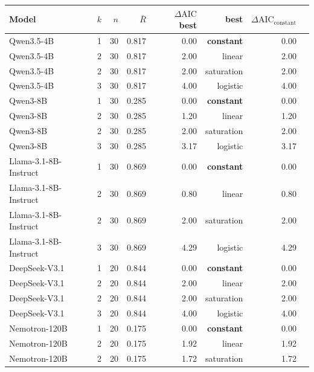 \documentclass{article}
\begin{document}
\begin{table}[t]
  \centering
  \small
  \begin{tabular}{lrrrrrrl}
    \toprule
    Model & $k$ & $n$ & $\bar R$ & $\Delta\text{AIC}$ best & best & $\Delta \text{AIC}_\text{constant}$ \\
    \midrule
    Qwen3.5-4B            & 1 & 30 & 0.817 & 0.00 & \textbf{constant}    & 0.00 \\
    Qwen3.5-4B            & 2 & 30 & 0.817 & 2.00 & linear              & 2.00 \\
    Qwen3.5-4B            & 2 & 30 & 0.817 & 2.00 & saturation          & 2.00 \\
    Qwen3.5-4B            & 3 & 30 & 0.817 & 4.00 & logistic            & 4.00 \\
    Qwen3-8B              & 1 & 30 & 0.285 & 0.00 & \textbf{constant}    & 0.00 \\
    Qwen3-8B              & 2 & 30 & 0.285 & 1.20 & linear              & 1.20 \\
    Qwen3-8B              & 2 & 30 & 0.285 & 2.00 & saturation          & 2.00 \\
    Qwen3-8B              & 3 & 30 & 0.285 & 3.17 & logistic            & 3.17 \\
    Llama-3.1-8B-Instruct & 1 & 30 & 0.869 & 0.00 & \textbf{constant}    & 0.00 \\
    Llama-3.1-8B-Instruct & 2 & 30 & 0.869 & 0.80 & linear              & 0.80 \\
    Llama-3.1-8B-Instruct & 2 & 30 & 0.869 & 2.00 & saturation          & 2.00 \\
    Llama-3.1-8B-Instruct & 3 & 30 & 0.869 & 4.29 & logistic            & 4.29 \\
    DeepSeek-V3.1         & 1 & 20 & 0.844 & 0.00 & \textbf{constant}    & 0.00 \\
    DeepSeek-V3.1         & 2 & 20 & 0.844 & 2.00 & linear              & 2.00 \\
    DeepSeek-V3.1         & 2 & 20 & 0.844 & 2.00 & saturation          & 2.00 \\
    DeepSeek-V3.1         & 3 & 20 & 0.844 & 4.00 & logistic            & 4.00 \\
    Nemotron-120B         & 1 & 20 & 0.175 & 0.00 & \textbf{constant}    & 0.00 \\
    Nemotron-120B         & 2 & 20 & 0.175 & 1.92 & linear              & 1.92 \\
    Nemotron-120B         & 2 & 20 & 0.175 & 1.72 & saturation          & 1.72 \\

\end{tabular}
\end{table}
\end{document}
